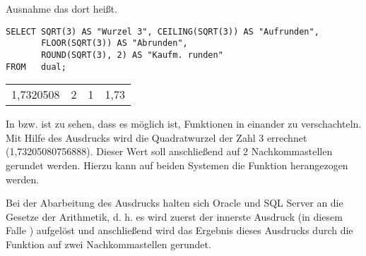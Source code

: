         Ausnahme das  dort 
        hei\ss{}t.
\clearpage
        \begin{lstlisting}[language=ms_sql,caption={Rundungsfunktionen in MS SQL},label=sql03_16]
SELECT SQRT(3) AS "Wurzel 3", CEILING(SQRT(3)) AS "Aufrunden",
       FLOOR(SQRT(3)) AS "Abrunden",
       ROUND(SQRT(3), 2) AS "Kaufm. runden"
FROM   dual;
        \end{lstlisting}
        \begin{center}
          \begin{small}
            \tablehead{}

            \begin{mssql}
              \begin{supertabular}{llll}
                1,7320508 & 2 & 1 & 1,73 \\
              \end{supertabular}
            \end{mssql}
          \end{small}
        \end{center}
        In  bzw.  ist zu sehen, dass es
        m\"oglich ist, Funktionen in einander zu verschachteln. Mit Hilfe des
        Ausdrucks  wird die Quadratwurzel der Zahl 3
        errechnet (1,73205080756888). Dieser Wert soll anschlie\ss end auf 2
        Nachkommastellen gerundet werden. Hierzu kann auf beiden Systemen die
        Funktion  herangezogen werden. 
        
        Bei der Abarbeitung des Ausdrucks 
        halten sich Oracle und SQL Server an die Gesetze der Arithmetik, d. h.
        es wird zuerst der innerste Ausdruck (in diesem Falle
        ) aufgel\"ost und anschlie\ss end wird das
        Ergebnis dieses Ausdrucks durch die Funktion  auf
        zwei Nachkommastellen gerundet.

